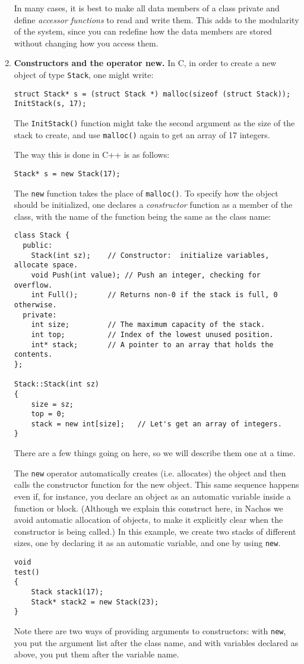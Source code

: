 \begin{enumerate}
In many cases, it is best to make all data members of a class private
and define {\em accessor functions} to read and write them.  This adds
to the modularity of the system, since you can redefine how the data
members are stored without changing how you access them.

\item {\bf Constructors and the operator new.}  In C, in
order to create a new object of type {\tt Stack}, one might write:
\begin{verbatim}
struct Stack* s = (struct Stack *) malloc(sizeof (struct Stack));
InitStack(s, 17);
\end{verbatim}
The {\tt InitStack()} function might take the second argument as the
size of the stack to create, and use {\tt malloc()} again to get an
array of 17 integers.

The way this is done in C++ is as follows:
\begin{verbatim}
Stack* s = new Stack(17);
\end{verbatim}
The {\tt new} function takes the place of {\tt malloc()}.  To
specify how the object should be initialized, one declares a {\it
constructor} function as a member of the class, with the name of the
function being the same as the class name:
\begin{verbatim}
class Stack {
  public:
    Stack(int sz);    // Constructor:  initialize variables, allocate space.
    void Push(int value); // Push an integer, checking for overflow.
    int Full();       // Returns non-0 if the stack is full, 0 otherwise.
  private:
    int size;         // The maximum capacity of the stack.
    int top;          // Index of the lowest unused position.
    int* stack;       // A pointer to an array that holds the contents.
};

Stack::Stack(int sz)
{
    size = sz;
    top = 0;
    stack = new int[size];   // Let's get an array of integers.
}
\end{verbatim}
There are a few things going on here, so we will describe them one at
a time.

The {\tt new} operator automatically creates (i.e. allocates) the object
and then calls the constructor function for the new object.  
This same sequence happens even if, for instance, you declare an object
as an automatic variable inside a function or block. (Although we explain
this construct here, in Nachos we avoid automatic allocation of objects,
to make it explicitly clear when the constructor is being called.)
In this example, we create two stacks of different sizes, one
by declaring it as an automatic variable, and one by using {\tt new}.
\begin{verbatim}
void
test()
{
    Stack stack1(17);
    Stack* stack2 = new Stack(23); 
}
\end{verbatim}
Note there are two ways of providing arguments to constructors: with
{\tt new}, you put the argument list after the class name, and with
variables declared as above, you put them after the variable name.


\end{enumerate}
